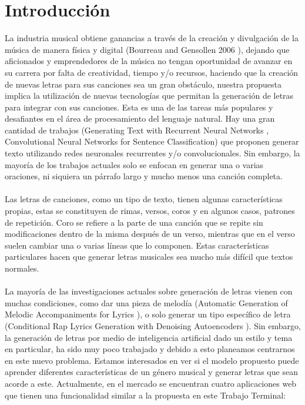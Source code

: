 \documentclass[12pt, a4paper, titlepage]{report}
\begin{document}
    \chapter{\textcolor{azulescom}{Introducción}}
    La industria musical obtiene ganancias a través de la creación y divulgación de la música de manera física y digital (Bourreau and Gensollen 2006 \cite{Bourreau_and_Gensollen}), dejando que aficionados y emprendedores de la música no tengan oportunidad de avanzar en su carrera por falta de creatividad, tiempo y/o recursos, haciendo que la creación de nuevas letras para sus canciones sea un gran obstáculo, nuestra propuesta implica la utilización de nuevas tecnologías que permitan la generación de letras para integrar con sus canciones. Esta es una de las tareas más populares y desafiantes en el área de procesamiento del lenguaje natural. Hay una gran cantidad de trabajos (Generating Text with Recurrent Neural Networks \cite{Generating_Text_with_RNN}, Convolutional Neural Networks for Sentence Classification\cite{CNN_for_Sentence_Classification}) que proponen generar texto utilizando redes neuronales recurrentes y/o convolucionales. Sin embargo, la mayoría de los trabajos actuales solo se enfocan en generar una o varias oraciones, ni siquiera un párrafo largo y mucho menos una canción completa.\\\\
    Las letras de canciones, como un tipo de texto, tienen algunas características propias, estas se constituyen de rimas, versos, coros y en algunos casos, patrones de repetición. Coro se refiere a la parte de una canción que se repite sin modificaciones dentro de la misma después de un verso, mientras que en el verso suelen cambiar una o varias líneas que lo componen. Estas características particulares hacen que generar letras musicales sea mucho más difícil que textos normales.\\\\
    La mayoría de las investigaciones actuales sobre generación de letras vienen con muchas condiciones, como dar una pieza de melodía (Automatic Generation of Melodic Accompaniments for Lyrics \cite{Automatic_Generation_of_Melodic_Accompaniments_for_Lyrics}), o solo generar un tipo específico de letra (Conditional Rap Lyrics Generation with Denoising Autoencoders \cite{Conditional_Rap_Lyrics_Generation}). Sin embargo, la generación de letras por medio de inteligencia artificial dado un estilo y tema en particular, ha sido muy poco trabajado y debido a esto planeamos centrarnos en este nuevo problema. Estamos interesados en ver si el modelo propuesto puede aprender diferentes características de un género musical y generar letras que sean acorde a este. Actualmente, en el mercado se encuentran cuatro aplicaciones web que tienen una funcionalidad similar a la propuesta en este Trabajo Terminal:\par
    
\end{document}

